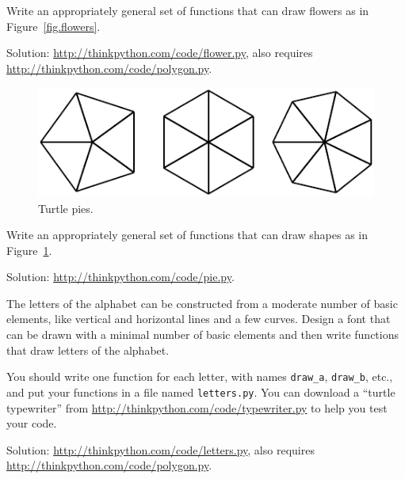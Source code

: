 \documentclass[10pt]{book}
\begin{document}
\begin{CJK}{UTF8}{gbsn}
\begin{exercise}

Write an appropriately general set of functions that
can draw flowers as in Figure~\ref{fig.flowers}.

Solution: \url{http://thinkpython.com/code/flower.py},
also requires \url{http://thinkpython.com/code/polygon.py}.

\end{exercise}

\begin{figure}
\centerline
{\includegraphics[scale=0.8]{figs/pies.pdf}}
\caption{Turtle pies.}
\label{fig.pies}
\end{figure}


\begin{exercise}

Write an appropriately general set of functions that
can draw shapes as in Figure~\ref{fig.pies}.

Solution: \url{http://thinkpython.com/code/pie.py}.

\end{exercise}

\begin{exercise}

The letters of the alphabet can be constructed from a moderate number
of basic elements, like vertical and horizontal lines and a few
curves.  Design a font that can be drawn with a minimal number of
basic elements and then write functions that draw letters of the
alphabet.

You should write one function for each letter, with names
\verb"draw_a", \verb"draw_b", etc., and put your functions
in a file named {\tt letters.py}.  You can download a
``turtle typewriter'' from \url{http://thinkpython.com/code/typewriter.py}
to help you test your code.

Solution: \url{http://thinkpython.com/code/letters.py}, also requires
\url{http://thinkpython.com/code/polygon.py}.

\end{exercise}


\end{CJK}
\end{document}
